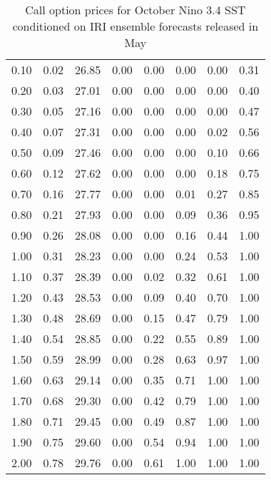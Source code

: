 \begin{table*}[ht]
\begin{tabular}{rrrrrrrr}
  0.10 & 0.02 & 26.85 & 0.00 & 0.00 & 0.00 & 0.00 & 0.31 \\ 
  0.20 & 0.03 & 27.01 & 0.00 & 0.00 & 0.00 & 0.00 & 0.40 \\ 
  0.30 & 0.05 & 27.16 & 0.00 & 0.00 & 0.00 & 0.00 & 0.47 \\ 
  0.40 & 0.07 & 27.31 & 0.00 & 0.00 & 0.00 & 0.02 & 0.56 \\ 
  0.50 & 0.09 & 27.46 & 0.00 & 0.00 & 0.00 & 0.10 & 0.66 \\ 
  0.60 & 0.12 & 27.62 & 0.00 & 0.00 & 0.00 & 0.18 & 0.75 \\ 
  0.70 & 0.16 & 27.77 & 0.00 & 0.00 & 0.01 & 0.27 & 0.85 \\ 
  0.80 & 0.21 & 27.93 & 0.00 & 0.00 & 0.09 & 0.36 & 0.95 \\ 
  0.90 & 0.26 & 28.08 & 0.00 & 0.00 & 0.16 & 0.44 & 1.00 \\ 
  1.00 & 0.31 & 28.23 & 0.00 & 0.00 & 0.24 & 0.53 & 1.00 \\ 
  1.10 & 0.37 & 28.39 & 0.00 & 0.02 & 0.32 & 0.61 & 1.00 \\ 
  1.20 & 0.43 & 28.53 & 0.00 & 0.09 & 0.40 & 0.70 & 1.00 \\ 
  1.30 & 0.48 & 28.69 & 0.00 & 0.15 & 0.47 & 0.79 & 1.00 \\ 
  1.40 & 0.54 & 28.85 & 0.00 & 0.22 & 0.55 & 0.89 & 1.00 \\ 
  1.50 & 0.59 & 28.99 & 0.00 & 0.28 & 0.63 & 0.97 & 1.00 \\ 
  1.60 & 0.63 & 29.14 & 0.00 & 0.35 & 0.71 & 1.00 & 1.00 \\ 
  1.70 & 0.68 & 29.30 & 0.00 & 0.42 & 0.79 & 1.00 & 1.00 \\ 
  1.80 & 0.71 & 29.45 & 0.00 & 0.49 & 0.87 & 1.00 & 1.00 \\ 
  1.90 & 0.75 & 29.60 & 0.00 & 0.54 & 0.94 & 1.00 & 1.00 \\ 
  2.00 & 0.78 & 29.76 & 0.00 & 0.61 & 1.00 & 1.00 & 1.00 \\ 
   \hline
\end{tabular}
\caption{Call option prices for October Nino 3.4 SST conditioned on IRI ensemble forecasts released in May} 
\end{table*}

